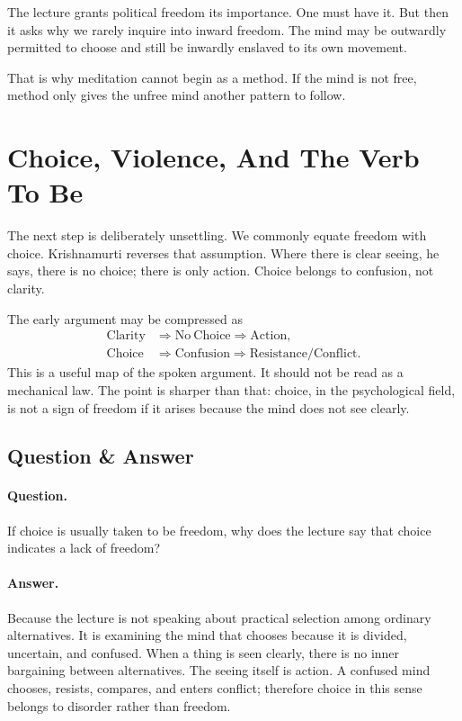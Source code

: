The lecture grants political freedom its importance. One must have it. But then it asks why we rarely inquire into inward freedom. The mind may be outwardly permitted to choose and still be inwardly enslaved to its own movement.

That is why meditation cannot begin as a method. If the mind is not free, method only gives the unfree mind another pattern to follow.

\section{Choice, Violence, And The Verb To Be}

The next step is deliberately unsettling. We commonly equate freedom with choice. Krishnamurti reverses that assumption. Where there is clear seeing, he says, there is no choice; there is only action. Choice belongs to confusion, not clarity.

The early argument may be compressed as
\begin{align}
\mathrm{Clarity} &\Rightarrow \mathrm{No\ Choice} \Rightarrow \mathrm{Action}, \\
\mathrm{Choice} &\Rightarrow \mathrm{Confusion} \Rightarrow \mathrm{Resistance/Conflict}.
\end{align}
This is a useful map of the spoken argument. It should not be read as a mechanical law. The point is sharper than that: choice, in the psychological field, is not a sign of freedom if it arises because the mind does not see clearly.

\subsection{Question \& Answer}

\paragraph{Question.}
If choice is usually taken to be freedom, why does the lecture say that choice indicates a lack of freedom?

\paragraph{Answer.}
Because the lecture is not speaking about practical selection among ordinary alternatives. It is examining the mind that chooses because it is divided, uncertain, and confused. When a thing is seen clearly, there is no inner bargaining between alternatives. The seeing itself is action. A confused mind chooses, resists, compares, and enters conflict; therefore choice in this sense belongs to disorder rather than freedom.

